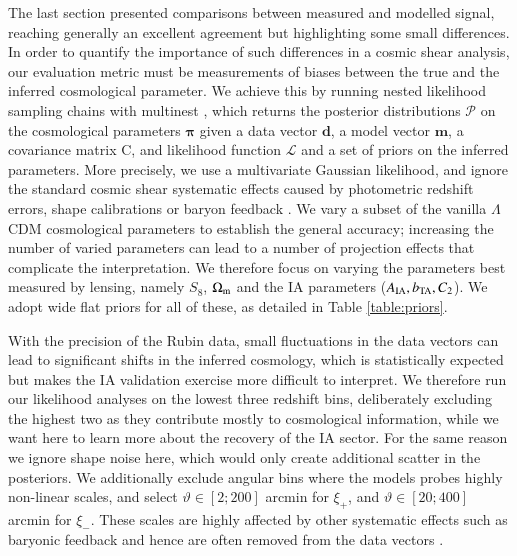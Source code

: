  
 The last section presented comparisons between measured and modelled signal, reaching generally an excellent agreement but highlighting some small differences. In order to quantify the importance of such differences in a cosmic shear analysis, our evaluation metric must be measurements of biases between the true and the inferred cosmological parameter. We achieve this by running nested likelihood sampling chains with {\sc multinest} \citep{Multinest}, which returns the posterior distributions $\mathcal{P}$ on the cosmological parameters $\boldsymbol \pi$ given a data vector $\boldsymbol  d$, a model vector $\boldsymbol m$, a covariance matrix C, and likelihood function $\mathcal L$ and a set of priors on the inferred parameters.  More precisely, we use a multivariate Gaussian likelihood, and ignore the standard cosmic shear systematic effects caused by photometric redshift errors, shape calibrations or baryon feedback \citep[see][for a recent example]{DESY3-KiDS1000}. We vary a subset of the vanilla $\Lambda$CDM cosmological parameters to establish the general accuracy; increasing the number of varied parameters can lead to a number of projection effects that complicate the interpretation. We therefore focus on varying the parameters best measured by lensing, namely $S_8$, $\Omega_{\rm m}$ and the IA parameters ($A_{\rm IA}, b_{\rm TA}, C_2$). We adopt wide flat priors for all of these, as detailed in Table \ref{table:priors}. 

With the precision of the Rubin data, small fluctuations in the data vectors can lead to significant shifts in the inferred cosmology, which is statistically  expected but makes the IA validation exercise more difficult to interpret. We therefore run our likelihood analyses on  the lowest three redshift bins, deliberately excluding the highest two as they contribute mostly to cosmological information, while we want here to learn more about the recovery of the IA sector. For the same reason we ignore shape noise here, which would only create additional scatter in the posteriors. We additionally exclude angular bins where the models probes highly non-linear scales, and select $\vartheta \in [2 ; 200]$ arcmin for $\xi_+$, and $\vartheta \in [20 ; 400]$ arcmin for $\xi_-$. These scales are highly affected by other systematic effects such as baryonic feedback \citep[see, e.g.][]{Semboloni11, HWVH15, 2020arXiv200715026H} and hence are often removed from the data vectors \citep[as in][]{DESY3_Amon}.

